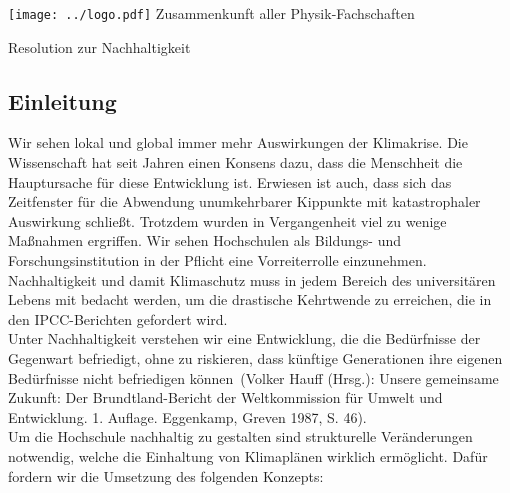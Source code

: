 \documentclass[DIV=calc]{scrartcl}
\let\oldgrqq=\grqq
\def\grqq{\oldgrqq\xspace}
\begin{document}
\hspace{0.87\textwidth}
\begin{minipage}{120pt}
	\vspace{-1.8cm}
	\texttt{[image: ../logo.pdf]}
	\centering
	\small Zusammenkunft aller Physik-Fachschaften
\end{minipage}

\begin{center}
  \huge{Resolution zur Nachhaltigkeit}\vspace{.25\baselineskip}\\
  \normalsize
\end{center}
\vspace{1cm}


%


\subsection*{Einleitung}
Wir sehen lokal und global immer mehr Auswirkungen der Klimakrise. Die Wissenschaft hat seit Jahren einen Konsens dazu, dass die Menschheit die Hauptursache für diese Entwicklung ist. Erwiesen ist auch, dass sich das Zeitfenster für die Abwendung unumkehrbarer Kippunkte mit katastrophaler Auswirkung schließt. Trotzdem wurden in Vergangenheit viel zu wenige Maßnahmen ergriffen. Wir sehen Hochschulen als Bildungs- und Forschungsinstitution in der Pflicht eine Vorreiterrolle einzunehmen. Nachhaltigkeit und damit Klimaschutz muss in jedem Bereich des universitären Lebens mit bedacht werden, um die drastische Kehrtwende zu erreichen, die in den IPCC-Berichten gefordert wird. 
\smallskip\\
Unter Nachhaltigkeit verstehen wir \glqq eine Entwicklung, die die Bedürfnisse der Gegenwart befriedigt, ohne zu riskieren, dass künftige Generationen ihre eigenen Bedürfnisse nicht befriedigen können\grqq~(Volker Hauff (Hrsg.): Unsere gemeinsame Zukunft: Der Brundtland-Bericht der Weltkommission für Umwelt und Entwicklung. 1. Auflage. Eggenkamp, Greven 1987, S. 46).
\smallskip\\
Um die Hochschule nachhaltig zu gestalten sind strukturelle Veränderungen notwendig, welche die Einhaltung von Klimaplänen wirklich ermöglicht. Dafür fordern wir die Umsetzung des folgenden Konzepts:
\end{document}
